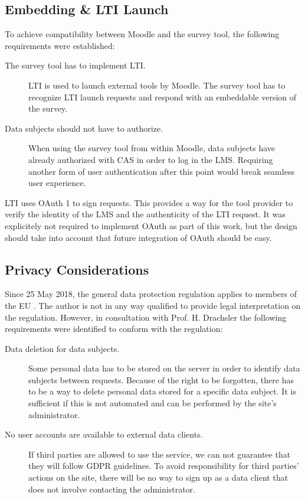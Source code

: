 \documentclass[a4paper,11pt]{article}
\begin{document}
        \subsection{Embedding \& LTI Launch}
            To achieve compatibility between Moodle and the survey tool, the following
            requirements were established:

            \begin{description}
                \item[The survey tool has to implement LTI.] LTI is used to launch
                external tools by Moodle. The survey tool has to recognize LTI launch requests
                and respond with an embeddable version of the survey.
                \item[Data subjects should not have to authorize.] When using the survey tool
                from within Moodle, data subjects have already authorized with CAS in order
                to log in the LMS. Requiring another form of user authentication after
                this point would break seamless user experience.
            \end{description}

            LTI uses OAuth 1 to sign requests. This provides a way for the tool provider
            to verify the identity of the LMS and the authenticity of the LTI request.
            It was explicitely not required to implement OAuth as part of this work, but 
            the design should take into account that future integration of OAuth should
            be easy.

        \subsection{Privacy Considerations}
            Since 25 May 2018, the general data protection regulation applies to members of the EU \cite{gdpr-info}.
            The author is not in any way qualified to provide legal interpretation on the regulation.
            However, in consultation with Prof. H. Drachsler the following requirements
            were identified to conform with the regulation:

            \begin{description}
                \item[Data deletion for data subjects.] Some personal data has to be stored
                on the server in order to identify data subjects between requests. Because of the
                right to be forgotten, there has to be a way to delete personal data stored for
                a specific data subject. It is sufficient if this is not automated and can be performed
                by the site's administrator.
                \item[No user accounts are available to external data clients.] If third parties are allowed to use
                the service, we can not guarantee that they will follow GDPR guidelines.
                To avoid responsibility for third parties' actions on the site, there will
                be no way to sign up as a data client that does not involve contacting the administrator.
            \end{description}
            
\end{document}
